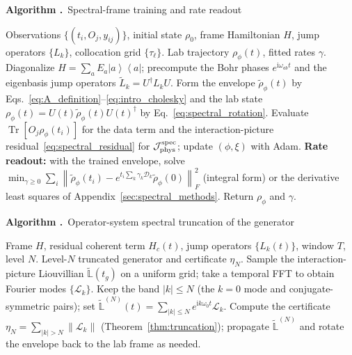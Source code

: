 \documentclass[twocolumn,aps,prxquantum,superscriptaddress,nofootinbib,floatfix,longbibliography]{revtex4-2}
\DeclareMathOperator{\Tr}{Tr}
\newcommand{\calJ}{\mathcal{J}}
\newcommand{\calD}{\mathcal{D}}
\newcommand{\calL}{\mathcal{L}}
\newcommand{\ii}{\mathrm{i}}
\newcommand{\norm}[1]{\left\lVert #1 \right\rVert}
\newcommand{\ket}[1]{\left\lvert #1 \right\rangle}
\newcommand{\bra}[1]{\left\langle #1 \right\rvert}
\newcommand{\proj}[1]{\ket{#1}\!\bra{#1}}
\newcommand{\rhophi}{\rho_{\phi}}
\begin{document}
\medskip
\noindent\hrulefill\par\vspace{-1.5ex}
\label{alg:spectral}%
\noindent\textbf{Algorithm \thealgorithm.}~Spectral-frame training and rate readout
\begin{algorithmic}[1]
\REQUIRE Observations $\{(t_i,O_j,y_{ij})\}$, initial state $\rho_0$, frame Hamiltonian $H$, jump operators $\{L_k\}$, collocation grid $\{\tau_\ell\}$.
\ENSURE Lab trajectory $\rhophi(t)$, fitted rates $\gamma$.
\STATE Diagonalize $H=\sum_aE_a\proj{a}$; precompute the Bohr phases $e^{\ii\omega_{ab}t}$ and the eigenbasis jump operators $\widetilde L_k=U^\dagger L_kU$.
    \STATE Form the envelope $\widetilde\rho_\phi(t)$ by Eqs.~\eqref{eq:A_definition}--\eqref{eq:intro_cholesky} and the lab state $\rhophi(t)=U(t)\widetilde\rho_\phi(t)U(t)^\dagger$ by Eq.~\eqref{eq:spectral_rotation}.
    \STATE Evaluate $\Tr[O_j\rhophi(t_i)]$ for the data term and the interaction-picture residual~\eqref{eq:spectral_residual} for $\calJ_{\rm phys}^{\rm spec}$; update $(\phi,\xi)$ with Adam.
\ENDFOR
\STATE \textbf{Rate readout:} with the trained envelope, solve $\min_{\gamma\ge0}\sum_i\norm{\widetilde\rho_\phi(t_i)-e^{t_i\sum_k\gamma_k\calD_k}\widetilde\rho_\phi(0)}_F^2$ (integral form) or the derivative least squares of Appendix~\ref{sec:spectral_methods}.
\STATE Return $\rhophi$ and $\gamma$.
\end{algorithmic}

\medskip
\noindent\hrulefill\par\vspace{-1.5ex}
\label{alg:truncation}%
\noindent\textbf{Algorithm \thealgorithm.}~Operator-system spectral truncation of the generator
\begin{algorithmic}[1]
\REQUIRE Frame $H$, residual coherent term $H_c(t)$, jump operators $\{L_k(t)\}$, window $T$, level $N$.
\ENSURE Level-$N$ truncated generator and certificate $\eta_N$.
\STATE Sample the interaction-picture Liouvillian $\widetilde{\mathbb L}(t_g)$ on a uniform grid; take a temporal FFT to obtain Fourier modes $\{\calL_k\}$.
\STATE Keep the band $|k|\le N$ (the $k{=}0$ mode and conjugate-symmetric pairs); set $\widetilde{\mathbb L}^{(N)}(t)=\sum_{|k|\le N}e^{\ii k\omega_0 t}\calL_k$.
\STATE Compute the certificate $\eta_N=\sum_{|k|>N}\norm{\calL_k}$ (Theorem~\ref{thm:truncation}); propagate $\widetilde{\mathbb L}^{(N)}$ and rotate the envelope back to the lab frame as needed.
\end{algorithmic}
\vspace{-1ex}\noindent\hrulefill
\twocolumngrid
\end{document}
